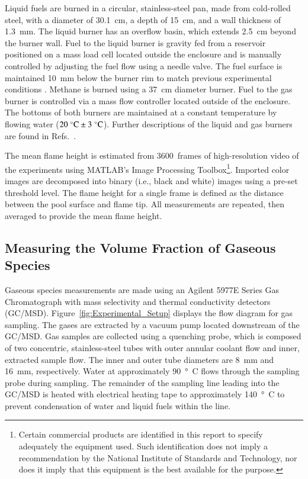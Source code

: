 \documentclass[preprint,review,12pt]{elsarticle}
\begin{document}
Liquid fuels are burned in a circular, stainless-steel pan, made from cold-rolled steel, with a diameter of 30.1~cm, a depth of 15~cm, and a wall thickness of 1.3~mm. The liquid burner has an overflow basin, which extends 2.5~cm beyond the burner wall. Fuel to the liquid burner is gravity fed from a reservoir positioned on a mass load cell located outside the enclosure and is manually controlled by adjusting the fuel flow using a needle valve. The fuel surface is maintained 10~mm below the burner rim to match previous experimental conditions \cite{Fisher1987,Hamins2016,Kim2019,Weckman1996}. Methane is burned using a 37~cm diameter burner. Fuel to the gas burner is controlled via a mass flow controller located outside of the enclosure. The bottoms of both burners are maintained at a constant temperature by flowing water ($20 \; ^\circ \hbox{C} \pm 3 \; ^\circ \hbox{C}$). Further descriptions of the liquid and gas burners are found in Refs.~\cite{Hamins2016,Hamins1994,Hamins1991,Hamins1996,Lock2008,Hamins1996a}.

The mean flame height is estimated from 3600~frames of high-resolution video of the experiments using MATLAB’s Image Processing Toolbox\footnote{\label{fn:product} Certain commercial products are identified in this report to specify adequately the equipment used. Such identification does not imply a recommendation by the National Institute of Standards and Technology, nor does it imply that this equipment is the best available for the purpose.}. Imported color images are decomposed into binary (i.e., black and white) images using a pre-set threshold level. The flame height for a single frame is defined as the distance between the pool surface and flame tip. All measurements are repeated, then averaged to provide the mean flame height.

\subsection{Measuring the Volume Fraction of Gaseous Species}
\label{ssec:Gas_Species_Setup}

Gaseous species measurements are made using an Agilent 5977E Series Gas Chromatograph with mass selectivity and thermal conductivity detectors (GC/MSD). Figure~\ref{fig:Experimental_Setup} displays the flow diagram for gas sampling. The gases are extracted by a vacuum pump located downstream of the GC/MSD. Gas samples are collected using a quenching probe, which is composed of two concentric, stainless-steel tubes with outer annular coolant flow and inner, extracted sample flow. The inner and outer tube diameters are \SI{8}{mm} and \SI{16}{mm}, respectively. Water at approximately \SI{90}{\degree C} flows through the sampling probe during sampling. The remainder of the sampling line leading into the GC/MSD is heated with electrical heating tape to approximately \SI{140}{\degree C} to prevent condensation of water and liquid fuels within the line.
\end{document}
